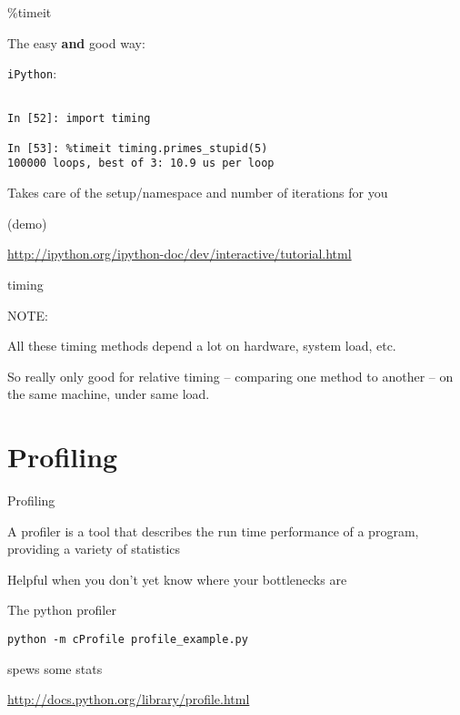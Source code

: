 \documentclass{beamer}
\begin{document}
\begin{frame}[fragile]{\%timeit}

{\Large The easy {\bf and} good way:}

\vfill
{\LARGE \verb|iPython|:}
\begin{verbatim}

In [52]: import timing

In [53]: %timeit timing.primes_stupid(5)
100000 loops, best of 3: 10.9 us per loop

\end{verbatim}

{\Large Takes care of the setup/namespace and number of iterations for you}

\vfill
(demo)

\vfill
\url{http://ipython.org/ipython-doc/dev/interactive/tutorial.html}
\end{frame} 


\begin{frame}[fragile]{timing}

{\LARGE NOTE:}

\vfill
{\Large All these timing methods depend a lot on hardware, system load, etc.}


\vfill
{\Large So really only good for relative timing -- comparing one method to another -- on the same machine, under same load.}

\end{frame}

\section{Profiling}

\begin{frame}[fragile]{Profiling}

{\Large A profiler is a tool that describes the run time performance of a
program, providing a variety of statistics}

\vfill
{\Large Helpful when you don't yet know where your bottlenecks are}

\vfill
{\Large The python profiler}

\begin{verbatim}
python -m cProfile profile_example.py  
\end{verbatim}
{\Large spews some stats}


\vfill
\url{http://docs.python.org/library/profile.html}
\end{frame} 
\end{document}

